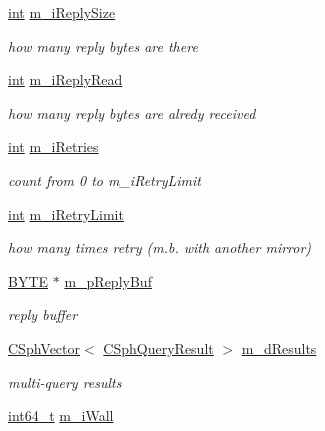 \begin{DoxyCompactItemize}
\hyperlink{sphinxexpr_8cpp_a4a26e8f9cb8b736e0c4cbf4d16de985e}{int} \hyperlink{structAgentConn__t_a118e79b17fe8cb55b9a7d25d607f431d}{m\-\_\-i\-Reply\-Size}
\begin{DoxyCompactList}\small\item\em how many reply bytes are there \end{DoxyCompactList}\item 
\hyperlink{sphinxexpr_8cpp_a4a26e8f9cb8b736e0c4cbf4d16de985e}{int} \hyperlink{structAgentConn__t_afa5270ede328ecb5c146a823807d44ab}{m\-\_\-i\-Reply\-Read}
\begin{DoxyCompactList}\small\item\em how many reply bytes are alredy received \end{DoxyCompactList}\item 
\hyperlink{sphinxexpr_8cpp_a4a26e8f9cb8b736e0c4cbf4d16de985e}{int} \hyperlink{structAgentConn__t_aa433a6e029e33cee67b34d07ec24f397}{m\-\_\-i\-Retries}
\begin{DoxyCompactList}\small\item\em count from 0 to m\-\_\-i\-Retry\-Limit \end{DoxyCompactList}\item 
\hyperlink{sphinxexpr_8cpp_a4a26e8f9cb8b736e0c4cbf4d16de985e}{int} \hyperlink{structAgentConn__t_a24f72eb1cfc5a147ba190887f62e1680}{m\-\_\-i\-Retry\-Limit}
\begin{DoxyCompactList}\small\item\em how many times retry (m.\-b. with another mirror) \end{DoxyCompactList}\item 
\hyperlink{sphinxstd_8h_a4ae1dab0fb4b072a66584546209e7d58}{B\-Y\-T\-E} $\ast$ \hyperlink{structAgentConn__t_add128e00687669a2b318381ec7e6be04}{m\-\_\-p\-Reply\-Buf}
\begin{DoxyCompactList}\small\item\em reply buffer \end{DoxyCompactList}\item 
\hyperlink{classCSphVector}{C\-Sph\-Vector}$<$ \hyperlink{classCSphQueryResult}{C\-Sph\-Query\-Result} $>$ \hyperlink{structAgentConn__t_acd760dc9dfe66a5d71ffdd75de3e821f}{m\-\_\-d\-Results}
\begin{DoxyCompactList}\small\item\em multi-\/query results \end{DoxyCompactList}\item 
\hyperlink{sphinxstd_8h_a996e72f71b11a5bb8b3b7b6936b1516d}{int64\-\_\-t} \hyperlink{structAgentConn__t_a07c96676f202daee7f9cf3e1869f55e7}{m\-\_\-i\-Wall}

\end{DoxyCompactItemize}
